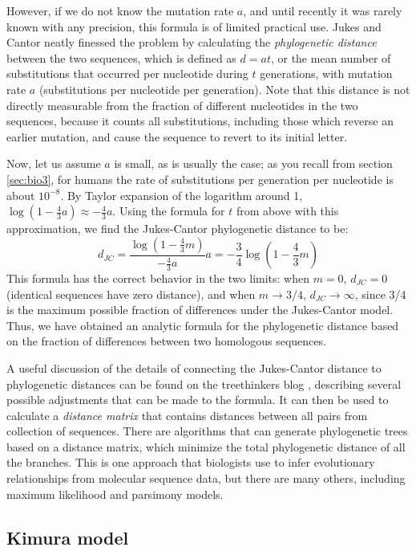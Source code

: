 \documentclass[
]{book}
\theoremstyle{definition}
\theoremstyle{definition}
\theoremstyle{definition}
\theoremstyle{remark}
\begin{document}
However, if we do not know the mutation rate \(a\), and until recently it was rarely known with any precision, this formula is of limited practical use. Jukes and Cantor neatly finessed the problem by calculating the \emph{phylogenetic distance} between the two sequences, which is defined as \(d = a t\), or the mean number of substitutions that occurred per nucleotide during \(t\) generations, with mutation rate \(a\) (substitutions per nucleotide per generation). Note that this distance is not directly measurable from the fraction of different nucleotides in the two sequences, because it counts all substitutions, including those which reverse an earlier mutation, and cause the sequence to revert to its initial letter.

Now, let us assume \(a\) is small, as is usually the case; as you recall from section \ref{sec:bio3}, for humans the rate of substitutions per generation per nucleotide is about \(10^{-8}\). By Taylor expansion of the logarithm around 1, \(\log (1 - \frac{4}{3} a) \approx - \frac{4}{3}a\). Using the formula for \(t\) from above with this approximation, we find the Jukes-Cantor phylogenetic distance to be:
\[ d_{JC} = \frac{\log (1 -  \frac{4}{3} m)}{ - \frac{4}{3}a} a =  -\frac{3}{4}\log (1 -  \frac{4}{3} m)\]
This formula has the correct behavior in the two limits: when \(m = 0\), \(d_{JC} = 0\) (identical sequences have zero distance), and when \(m \rightarrow 3/4\), \(d_{JC} \rightarrow \infty\), since 3/4 is the maximum possible fraction of differences under the Jukes-Cantor model. Thus, we have obtained an analytic formula for the phylogenetic distance based on the fraction of differences between two homologous sequences.

A useful discussion of the details of connecting the Jukes-Cantor distance to phylogenetic distances can be found on the treethinkers blog \citep{thomson_jukes_2013}, describing several possible adjustments that can be made to the formula. It can then be used to calculate a \emph{distance matrix} that contains distances between all pairs from collection of sequences. There are algorithms that can generate phylogenetic trees based on a distance matrix, which minimize the total phylogenetic distance of all the branches. This is one approach that biologists use to infer evolutionary relationships from molecular sequence data, but there are many others, including maximum likelihood and parsimony models.

\hypertarget{kimura-model}{%
\subsection{Kimura model}\label{kimura-model}}
\end{document}
